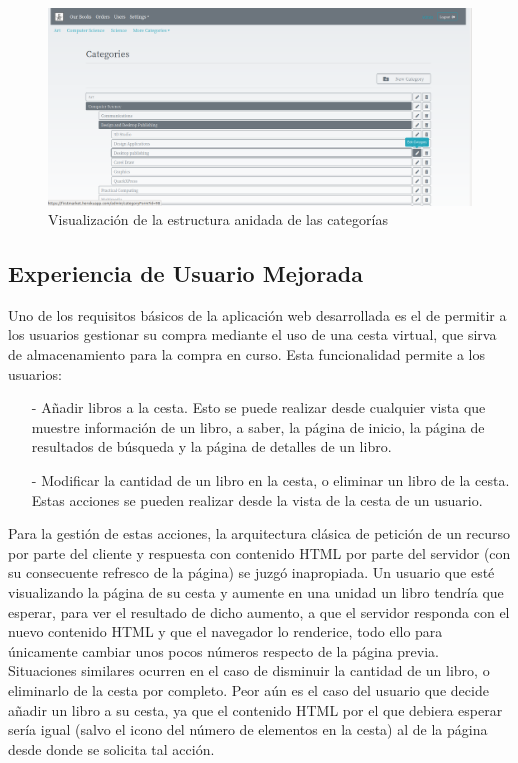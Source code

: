\documentclass[a4paper]{article}
\begin{document}
    \begin{figure}[htb!]
    	\centering
    	\includegraphics[width=\textwidth]{nested_categories}
    	\caption{Visualización de la estructura anidada de las categorías}
    	\label{fig:nested_categories}
    \end{figure}
    
    \subsection{Experiencia de Usuario Mejorada}
    Uno de los requisitos básicos de la aplicación web desarrollada es el de permitir a los usuarios gestionar su compra mediante el uso de una cesta virtual, que sirva de almacenamiento para la compra en curso. Esta funcionalidad permite a los usuarios:
    
    \begin{itemize}
    	\item[-] Añadir libros a la cesta. Esto se puede realizar desde cualquier vista que muestre información de un libro, a saber, la página de inicio, la página de resultados de búsqueda y la página de detalles de un libro.
    	\item[-] Modificar la cantidad de un libro en la cesta, o eliminar un libro de la cesta. Estas acciones se pueden realizar desde la vista de la cesta de un usuario.
    \end{itemize}
    
    Para la gestión de estas acciones, la arquitectura clásica de petición de un recurso por parte del cliente y respuesta con contenido HTML por parte del servidor (con su consecuente refresco de la página) se juzgó inapropiada. Un usuario que esté visualizando la página de su cesta y aumente en una unidad un libro tendría que esperar, para ver el resultado de dicho aumento, a que el servidor responda con el nuevo contenido HTML y que el navegador lo renderice, todo ello para únicamente cambiar unos pocos números respecto de la página previa. Situaciones similares ocurren en el caso de disminuir la cantidad de un libro, o eliminarlo de la cesta por completo. Peor aún es el caso del usuario que decide añadir un libro a su cesta, ya que el contenido HTML por el que debiera esperar sería igual (salvo el icono del número de elementos en la cesta) al de la página desde donde se solicita tal acción.
    
\end{document}
